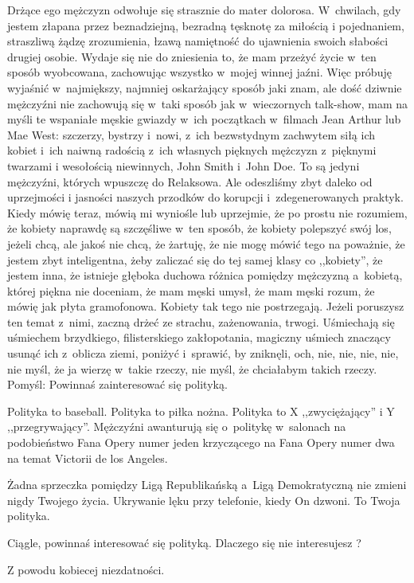 \documentclass[oneside,polish,12pt,sfheadings]{mwbk}
\begin{document}
Drżące ego mężczyzn odwołuje się strasznie do mater dolorosa. W~chwilach,
gdy jestem złapana przez beznadziejną, bezradną tęsknotę za miłością
i pojednaniem, straszliwą żądzę zrozumienia, łzawą namiętność do ujawnienia
swoich słabości drugiej osobie. Wydaje się nie do zniesienia to, że
mam przeżyć życie w~ten sposób wyobcowana, zachowując wszystko w~mojej
winnej jaźni. Więc próbuję wyjaśnić w~najmiększy, najmniej oskarżający
sposób jaki znam, ale dość dziwnie mężczyźni nie zachowują się w~taki
sposób jak w~wieczornych talk-show, mam na myśli te wspaniałe męskie
gwiazdy w~ich początkach w~filmach Jean Arthur lub Mae West: szczerzy,
bystrzy i~nowi, z~ich bezwstydnym zachwytem siłą ich kobiet i~ich
naiwną radością z~ich własnych pięknych mężczyzn z~pięknymi twarzami
i wesołością niewinnych, John Smith i~John Doe. To są jedyni mężczyźni,
których wpuszczę do Relaksowa. Ale odeszliśmy zbyt daleko od uprzejmości
i jasności naszych przodków do korupcji i~zdegenerowanych praktyk.
Kiedy mówię teraz, mówią mi wyniośle lub uprzejmie, że po prostu nie
rozumiem, że kobiety naprawdę są szczęśliwe w~ten sposób, że kobiety
polepszyć swój los, jeżeli chcą, ale jakoś nie chcą, że żartuję, że
nie mogę mówić tego na poważnie, że jestem zbyt inteligentna, żeby
zaliczać się do tej samej klasy co ,,kobiety'', że jestem inna, że
istnieje głęboka duchowa różnica pomiędzy mężczyzną a~kobietą, której
piękna nie doceniam, że mam męski umysł, że mam męski rozum, że mówię
jak płyta gramofonowa. Kobiety tak tego nie postrzegają. Jeżeli poruszysz
ten temat z~nimi, zaczną drżeć ze strachu, zażenowania, trwogi. Uśmiechają
się uśmiechem brzydkiego, filisterskiego zakłopotania, magiczny uśmiech
znaczący usunąć ich z~oblicza ziemi, poniżyć i~sprawić, by zniknęli,
och, nie, nie, nie, nie, nie myśl, że ja wierzę w~takie rzeczy, nie
myśl, że chciałabym takich rzeczy. Pomyśl: Powinnaś zainteresować
się polityką.

Polityka to baseball. Polityka to piłka nożna. Polityka to X ,,zwyciężający''
i Y ,,przegrywający''. Mężczyźni awanturują się o~politykę w~salonach
na podobieństwo Fana Opery numer jeden krzyczącego na Fana Opery numer
dwa na temat Victorii de los Angeles.

Żadna sprzeczka pomiędzy Ligą Republikańską a~Ligą Demokratyczną nie
zmieni nigdy Twojego życia. Ukrywanie lęku przy telefonie, kiedy On
dzwoni. To Twoja polityka.

Ciągle, powinnaś interesować się polityką. Dlaczego się nie interesujesz
?

Z powodu kobiecej niezdatności.
\end{document}

